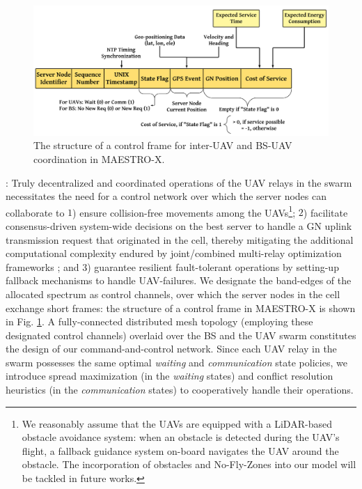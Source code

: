 \documentclass[12pt, draftcls, onecolumn]{IEEEtran}
\theoremstyle{plain}
\theoremstyle{definition}
\theoremstyle{remark}
\begin{document}
\begin{figure} [t]
    \centering
    \includegraphics[width=0.9\linewidth]{figs/Control_Frame_Design.png}
    \caption{The structure of a control frame for inter-UAV and BS-UAV coordination in MAESTRO-X.}
    \vspace{-10mm}
    \label{F5.5}
\end{figure}

: Truly decentralized and coordinated operations of the UAV relays in the swarm necessitates the need for a control network over which the server nodes can collaborate to $1$) ensure collision-free movements among the UAVs\footnote{We reasonably assume that the UAVs are equipped with a LiDAR-based obstacle avoidance system: when an obstacle is detected during the UAV's flight, a fallback guidance system on-board navigates the UAV around the obstacle. The incorporation of obstacles and No-Fly-Zones into our model will be tackled in future works.}; $2$) facilitate consensus-driven system-wide decisions on the best server to handle a GN uplink transmission request that originated in the cell, thereby mitigating the additional computational complexity endured by joint/combined multi-relay optimization frameworks \cite{DDQN, CSCA-ADMM}; and $3$) guarantee resilient fault-tolerant operations by setting-up fallback mechanisms to handle UAV-failures. We designate the band-edges of the allocated spectrum as control channels, over which the server nodes in the cell exchange short frames: the structure of a control frame in MAESTRO-X is shown in Fig. \ref{F5.5}. A fully-connected distributed mesh topology (employing these designated control channels) overlaid over the BS and the UAV swarm constitutes the design of our command-and-control network. Since each UAV relay in the swarm possesses the same optimal \emph{waiting} and \emph{communication} state policies, we introduce spread maximization (in the \emph{waiting} states) and conflict resolution heuristics (in the \emph{communication} states) to cooperatively handle their operations. 
\end{document}
